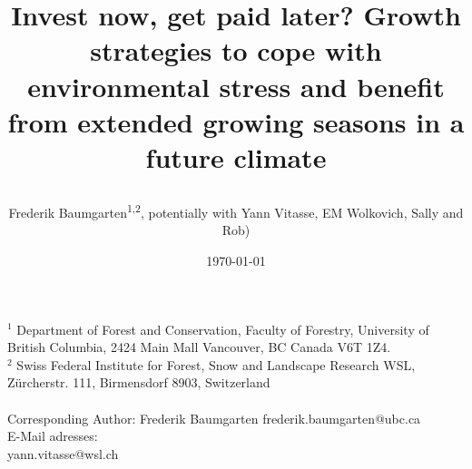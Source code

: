 \documentclass{article}
\begin{document}
	
	
	\title{Invest now, get paid later? Growth strategies to cope with environmental stress and benefit from extended growing seasons in a future climate %
		
		
	} 
	
	\date{\today}
	\author{Frederik Baumgarten\textsuperscript{1,2}, potentially with Yann Vitasse, EM Wolkovich, Sally and Rob)}
	\maketitle
	
	$^1$ Department of Forest and Conservation, Faculty of Forestry, University of British Columbia, 2424 Main Mall
	Vancouver, BC Canada V6T 1Z4. \\
	
	
	
	$^2$  Swiss Federal Institute for Forest, Snow and Landscape Research WSL, Zürcherstr. 111, Birmensdorf 8903, Switzerland\\ \\
	
	Corresponding Author: Frederik Baumgarten frederik.baumgarten@ubc.ca \\
	E-Mail adresses:\\
	yann.vitasse@wsl.ch\\
	
	
	
\end{document}
